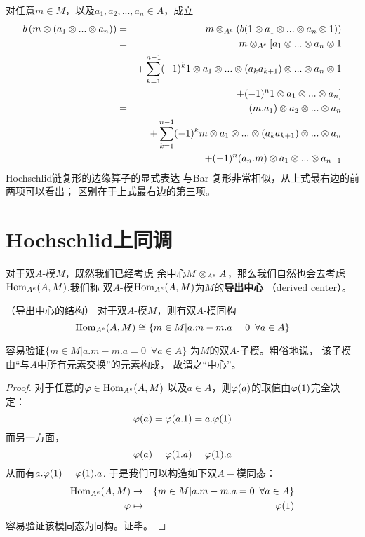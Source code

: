 对任意$m\in M$，以及$a_1,a_2,...,a_n\in A$，成立
\begin{eqnarray*}
    b\left(m\otimes (a_1\otimes...\otimes a_n)\right)
&=& m\otimes_{A^e}
      \left(
        b(1\otimes a_1\otimes...\otimes a_n\otimes 1)
      \right)\\
&=& m\otimes_{A^e}
      \large[
        a_1\otimes...\otimes a_n\otimes 1
      \\
&&+  \sum_{k=1}^{n-1}(-1)^k
           1\otimes a_1\otimes...\otimes(a_ka_{k+1})\otimes...\otimes a_n\otimes 1\\
&&+
        (-1)^n1\otimes a_1\otimes...\otimes a_n
    \large]\\
&=& (m.a_1)\otimes a_2\otimes...\otimes a_n\\
&&+ \sum_{k=1}^{n-1}(-1)^k
      m\otimes a_1\otimes...\otimes(a_ka_{k+1})\otimes...\otimes a_n\\
&&+ (-1)^n(a_n.m)\otimes a_1\otimes...\otimes a_{n-1}
\end{eqnarray*}
Hochschlid链复形的边缘算子的显式表达
与Bar-复形非常相似，从上式最右边的前两项可以看出；
区别在于上式最右边的第三项。

\section{Hochschlid上同调}

对于双$A$-模$M$，既然我们已经考虑
余中心$M\otimes_{A^e}A$，那么我们自然也会去考虑
$\operatorname{Hom}_{A^e}(A,M)$.我们称
双$A$-模$\operatorname{Hom}_{A^e}(A,M)$为$M$的\textbf{导出中心}
（derived center）。

\begin{prop}（导出中心的结构）
\label{双模的导出中心的结构prop}
对于双$A$-模$M$，则有双$A$-模同构
$$\operatorname{Hom}_{A^e}(A,M)
\cong\{m\in M|a.m-m.a=0\,\,\,\forall a\in A\}$$
\end{prop}

容易验证$\{m\in M|a.m-m.a=0\,\,\,\forall a\in A\}$
为$M$的双$A$-子模。粗俗地说，
该子模由“与$A$中所有元素交换”的元素构成，
故谓之“中心”。

\begin{proof}对于任意的$\varphi\in\operatorname{Hom}_{A^e}(A,M)$
以及$a\in A$，则$\varphi(a)$的取值由$\varphi(1)$完全决定：
$$\varphi(a)=\varphi(a.1)=a.\varphi(1)$$
而另一方面，
$$\varphi(a)=\varphi(1.a)=\varphi(1).a$$
从而有$a.\varphi(1)=\varphi(1).a$.
于是我们可以构造如下双$A-$模同态：
\begin{eqnarray*}
\operatorname{Hom}_{A^e}(A,M)
&\to&\{m\in M|a.m-m.a=0\,\,\,\forall a\in A\}\\
\varphi&\mapsto&\varphi(1)
\end{eqnarray*}
容易验证该模同态为同构。证毕。
\end{proof}

